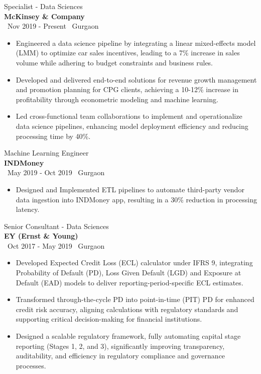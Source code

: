 \documentclass[a4paper,10pt]{article}
\begin{document}
{\large Specialist - Data Sciences} \\
\textbf{McKinsey \& Company} \\
\faCalendar \, Nov 2019 - Present \hfill \faMapMarker \, Gurgaon
\begin{itemize}[itemsep=1pt, topsep=0pt] %
    \item Engineered a data science pipeline by integrating a linear mixed-effects model (LMM) to optimize car sales incentives, leading to a 7\% increase in sales volume while adhering to budget constraints and business rules.
    \item Developed and delivered end-to-end solutions for revenue growth management and promotion planning for CPG clients, achieving a 10-12\% increase in profitability through econometric modeling and machine learning.
    \item Led cross-functional team collaborations to implement and operationalize data science pipelines, enhancing model deployment efficiency and reducing processing time by 40\%.
\end{itemize}

{\large Machine Learning Engineer} \\
\textbf{INDMoney} \\
\faCalendar \, May 2019 - Oct 2019 \hfill \faMapMarker \, Gurgaon
\begin{itemize}[itemsep=1pt, topsep=0pt]
    \item Designed and Implemented ETL pipelines to automate third-party vendor data ingestion into INDMoney app, resulting in a 30\% reduction in processing latency.
\end{itemize}

{\large Senior Consultant - Data Sciences} \\
\textbf{EY (Ernst \& Young)} \\
\faCalendar \, Oct 2017 - May 2019 \hfill \faMapMarker \, Gurgaon
\begin{itemize}[itemsep=1pt, topsep=0pt]
    \item Developed Expected Credit Loss (ECL) calculator under IFRS 9, integrating Probability of Default (PD), Loss Given Default (LGD) and Exposure at Default (EAD) models to deliver reporting-period-specific ECL estimates.
    \item Transformed through-the-cycle PD into point-in-time (PIT) PD for enhanced credit risk accuracy, aligning calculations with regulatory standards and supporting critical decision-making for financial institutions.
    \item Designed a scalable regulatory framework, fully automating capital stage reporting (Stages 1, 2, and 3), significantly improving transparency, auditability, and efficiency in regulatory compliance and governance processes.
\end{itemize}
\end{document}
